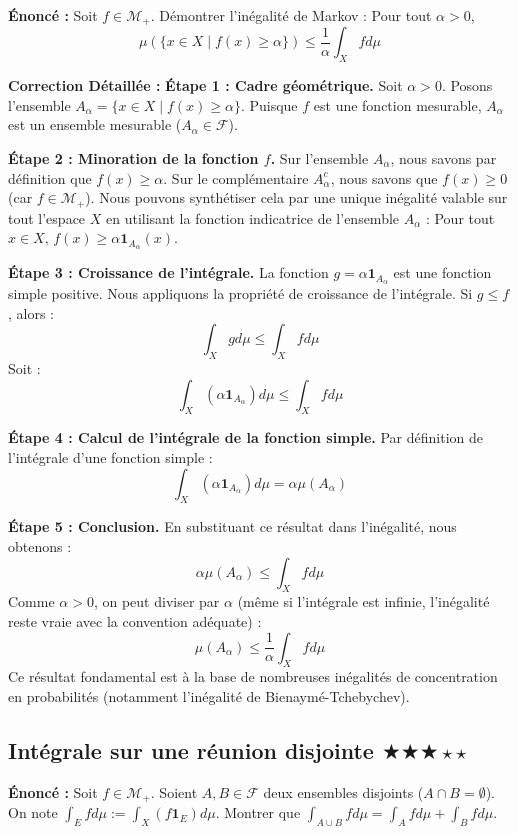 \documentclass[11pt,a4paper]{article}
\begin{document}
\textbf{Énonc\'e :}
Soit $f \in \mathcal{M}_+$. D\'emontrer l'in\'egalit\'e de Markov :
Pour tout $\alpha > 0$,
$$\mu(\{x \in X \mid f(x) \ge \alpha\}) \le \frac{1}{\alpha} \int_X f d\mu$$

\textbf{Correction D\'etaill\'ee :}
\textbf{Étape 1 : Cadre g\'eom\'etrique.}
Soit $\alpha > 0$. Posons l'ensemble $A_\alpha = \{x \in X \mid f(x) \ge \alpha\}$.
Puisque $f$ est une fonction mesurable, $A_\alpha$ est un ensemble mesurable ($A_\alpha \in \mathcal{F}$).

\textbf{Étape 2 : Minoration de la fonction $f$.}
Sur l'ensemble $A_\alpha$, nous savons par d\'efinition que $f(x) \ge \alpha$.
Sur le compl\'ementaire $A_\alpha^c$, nous savons que $f(x) \ge 0$ (car $f \in \mathcal{M}_+$).
Nous pouvons synth\'etiser cela par une unique in\'egalit\'e valable sur tout l'espace $X$ en utilisant la fonction indicatrice de l'ensemble $A_\alpha$ :
Pour tout $x \in X$, $f(x) \ge \alpha \mathbf{1}_{A_\alpha}(x)$.

\textbf{Étape 3 : Croissance de l'int\'egrale.}
La fonction $g = \alpha \mathbf{1}_{A_\alpha}$ est une fonction simple positive.
Nous appliquons la propri\'et\'e de croissance de l'int\'egrale. Si $g \le f$, alors :
$$\int_X g d\mu \le \int_X f d\mu$$
Soit :
$$\int_X (\alpha \mathbf{1}_{A_\alpha}) d\mu \le \int_X f d\mu$$

\textbf{Étape 4 : Calcul de l'int\'egrale de la fonction simple.}
Par d\'efinition de l'int\'egrale d'une fonction simple :
$$\int_X (\alpha \mathbf{1}_{A_\alpha}) d\mu = \alpha \mu(A_\alpha)$$

\textbf{Étape 5 : Conclusion.}
En substituant ce r\'esultat dans l'in\'egalit\'e, nous obtenons :
$$\alpha \mu(A_\alpha) \le \int_X f d\mu$$
Comme $\alpha > 0$, on peut diviser par $\alpha$ (m\^eme si l'int\'egrale est infinie, l'in\'egalit\'e reste vraie avec la convention ad\'equate) :
$$\mu(A_\alpha) \le \frac{1}{\alpha} \int_X f d\mu$$
Ce r\'esultat fondamental est \`a la base de nombreuses in\'egalit\'es de concentration en probabilit\'es (notamment l'in\'egalit\'e de Bienaym\'e-Tchebychev).


\subsection*{Int\'egrale sur une r\'eunion disjointe \quad $\bigstar\bigstar\bigstar\star\star$}

\textbf{Énonc\'e :}
Soit $f \in \mathcal{M}_+$. Soient $A, B \in \mathcal{F}$ deux ensembles disjoints ($A \cap B = \emptyset$).
On note $\int_E f d\mu := \int_X (f \mathbf{1}_E) d\mu$.
Montrer que $\int_{A \cup B} f d\mu = \int_A f d\mu + \int_B f d\mu$.
\end{document}
